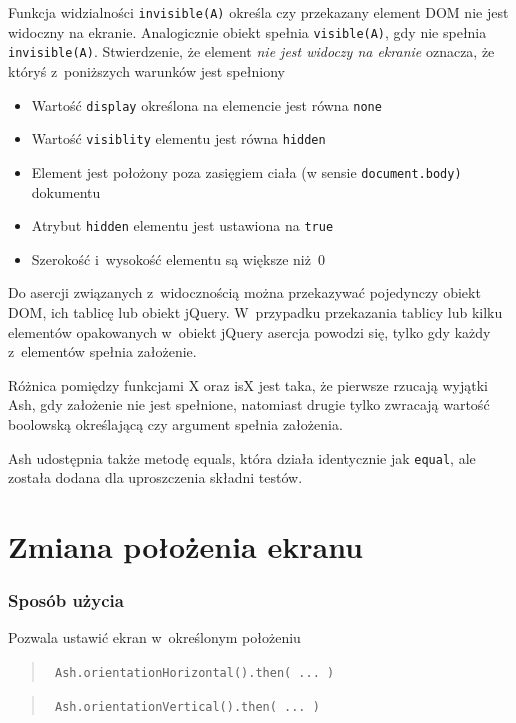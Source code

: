 \documentclass[brudnopis]{xmgr}
\begin{document}
Funkcja widzialności \texttt{invisible(A)} określa czy przekazany element DOM nie jest widoczny na ekranie. Analogicznie obiekt spełnia \texttt{visible(A)}, gdy nie spełnia \texttt{invisible(A)}. Stwierdzenie, że element {\it nie jest widoczy na ekranie} oznacza, że któryś z~poniższych warunków jest spełniony

\begin{itemize}
  \item Wartość \texttt{display} określona na elemencie jest równa \texttt{none}
  \item Wartość \texttt{visiblity} elementu jest równa \texttt{hidden}
  \item Element jest położony poza zasięgiem ciała (w sensie \texttt{document.body)} dokumentu
  \item Atrybut \texttt{hidden} elementu jest ustawiona na \texttt{true}
  \item Szerokość i~wysokość elementu są większe niż~0
\end{itemize}

Do asercji związanych z~widocznością można przekazywać pojedynczy obiekt DOM, ich tablicę lub obiekt jQuery. W~przypadku przekazania tablicy lub kilku elementów opakowanych w~obiekt jQuery asercja powodzi się, tylko gdy każdy z~elementów spełnia założenie. 

Różnica pomiędzy funkcjami X oraz isX jest taka, że pierwsze rzucają wyjątki Ash, gdy założenie nie jest spełnione, natomiast drugie tylko zwracają wartość boolowską określającą czy argument spełnia założenia.  

Ash udostępnia także metodę equals, która działa identycznie jak \texttt{equal}, ale została dodana dla uproszczenia składni testów.

\section{Zmiana położenia ekranu}

\subsubsection{Sposób użycia}
Pozwala ustawić ekran w~określonym położeniu

\begin{quote}
  \texttt{  Ash.orientationHorizontal().then( ... )  }
\end{quote}

\begin{quote}
  \texttt{  Ash.orientationVertical().then( ... )  } 
\end{quote}
\end{document}
